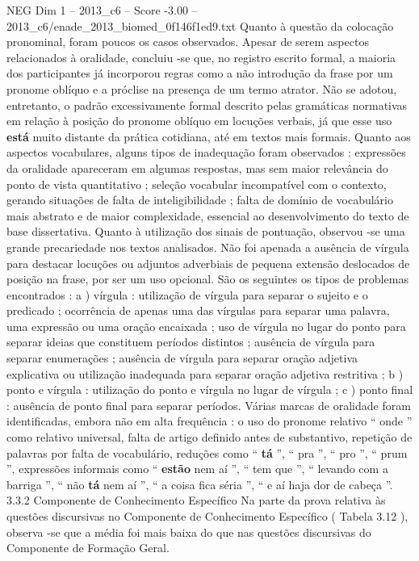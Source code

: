 \begin{textsample}{NEG Dim 1 – 2013\_c6 – Score -3.00 – 2013\_c6/enade\_2013\_biomed\_0f146f1ed9.txt}
Quanto à questão da colocação pronominal, foram poucos os casos observados.
Apesar de serem aspectos relacionados à oralidade, concluiu -se que, no registro escrito formal, a maioria dos participantes já incorporou regras como a não introdução da frase por um pronome oblíquo e a próclise na presença de um termo atrator.
Não se adotou, entretanto, o padrão excessivamente formal descrito pelas gramáticas normativas em relação à posição do pronome oblíquo em locuções verbais, já que esse uso \textbf{está} muito distante da prática cotidiana, até em textos mais formais.
Quanto aos aspectos vocabulares, alguns tipos de inadequação foram observados : expressões da oralidade apareceram em algumas respostas, mas sem maior relevância do ponto de vista quantitativo ; seleção vocabular incompatível com o contexto, gerando situações de falta de inteligibilidade ; falta de domínio de vocabulário mais abstrato e de maior complexidade, essencial ao desenvolvimento do texto de base dissertativa.
Quanto à utilização dos sinais de pontuação, observou -se uma grande precariedade nos textos analisados.
Não foi apenada a ausência de vírgula para destacar locuções ou adjuntos adverbiais de pequena extensão deslocados de posição na frase, por ser um uso opcional.
São os seguintes os tipos de problemas encontrados : a ) vírgula : utilização de vírgula para separar o sujeito e o predicado ; ocorrência de apenas uma das vírgulas para separar uma palavra, uma expressão ou uma oração encaixada ; uso de vírgula no lugar do ponto para separar ideias que constituem períodos distintos ; ausência de vírgula para separar enumerações ; ausência de vírgula para separar oração adjetiva explicativa ou utilização inadequada para separar oração adjetiva restritiva ; b ) ponto e vírgula : utilização do ponto e vírgula no lugar de vírgula ; c ) ponto final : ausência de ponto final para separar períodos.
Várias marcas de oralidade foram identificadas, embora não em alta frequência : o uso do pronome relativo “ onde ” como relativo universal, falta de artigo definido antes de substantivo, repetição de palavras por falta de vocabulário, reduções como “ \textbf{tá} ”, “ pra ”, “ pro ”, “ prum ”, expressões informais como “ \textbf{estão} nem aí ”, “ tem que ”, “ levando com a barriga ”, “ não \textbf{tá} nem aí ”, “ a coisa fica séria ”, “ e aí haja dor de cabeça ”. 3.3.2 Componente de Conhecimento Específico Na parte da prova relativa às questões discursivas no Componente de Conhecimento Específico ( Tabela 3.12 ), observa -se que a média foi mais baixa do que nas questões discursivas do Componente de Formação Geral.

\end{textsample}

